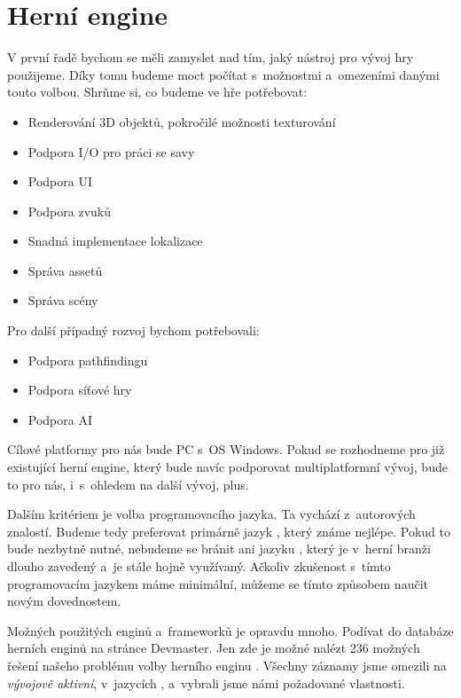 
\section{Herní engine}
V první řadě bychom se měli zamyslet nad tím, jaký nástroj pro vývoj hry použijeme. Díky tomu budeme moct počítat s~možnostmi a~omezeními danými touto volbou. Shrňme si, co budeme ve hře potřebovat:

\begin{itemize}
	\item Renderování 3D objektů, pokročilé možnosti texturování
	\item Podpora I/O pro práci se savy
	\item Podpora UI
	\item Podpora zvuků
	\item Snadná implementace lokalizace
	\item Správa assetů
	\item Správa scény
	
\end{itemize}

Pro další případný rozvoj bychom potřebovali:

\begin{itemize}
	\item Podpora pathfindingu
	\item Podpora síťové hry
	\item Podpora AI
\end{itemize}

Cílové platformy pro nás bude PC s~OS Windows. Pokud se rozhodneme pro již existující herní engine, který bude navíc podporovat multiplatformní vývoj, bude to pro nás, i~s~ohledem na další vývoj, plus.

Dalším kritériem je volba programovacího jazyka. Ta vychází z~autorových znalostí. Budeme tedy preferovat primárně jazyk \CS{}, který známe nejlépe. Pokud to bude nezbytně nutné, nebudeme se bránit ani jazyku \CPP{}, který je v~herní branži dlouho zavedený a~je stále hojně využívaný. Ačkoliv zkušenost s~tímto programovacím jazykem máme minimální, můžeme se tímto způsobem naučit novým dovednostem.


Možných použitých enginů a~frameworků je opravdu mnoho. Podívat do databáze herních enginů na stránce Devmaster. Jen zde je možné nalézt 236 možných řešení našeho problému volby herního enginu \citep{engines_list}. Všechny záznamy jsme omezili na \textit{vývojově aktivní}, v~jazycích \CS{}, \CPP{} a~vybrali jsme námi požadované vlastnosti.

